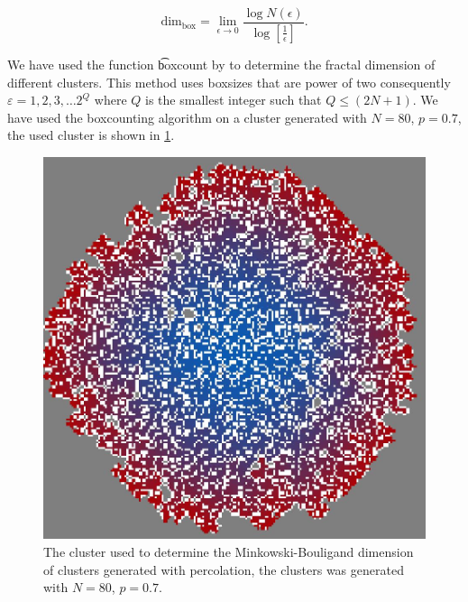 

	\begin{equation}
		\text{dim}_{\text{box}} = \lim_{\epsilon \to 0} \frac{\log N(\epsilon)}{\log\left[ \frac{1}{\epsilon} \right]}.
	\end{equation}

We have used the function \t{boxcount} by \textcite{boxCounting} to determine the fractal dimension of different clusters. This method uses boxsizes that are power of two consequently $\varepsilon = 1, 2, 3, \dotsc 2^Q$ where $Q$ is the smallest integer such that $Q \leq (2N + 1)$. We have used the boxcounting algorithm on a cluster generated with $N= 80$, $p = 0.7$, the used cluster is shown in \cref{fig:exp_fractal:cluster}.

\begin{figure}
	\centering
	\includegraphics[width=1\columnwidth]{./img/assignment_fractal_cluster}
	\caption{The cluster used to determine the Minkowski-Bouligand dimension of clusters generated with percolation, the clusters was generated with $N = 80$, $p = 0.7$.}
	\label{fig:exp_fractal:cluster}
\end{figure}

